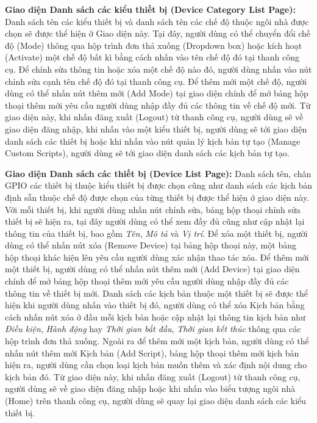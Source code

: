 \documentclass[12pt,a4paper,oneside]{extbook}
\begin{document}
\textbf{Giao diện Danh sách các kiểu thiết bị (Device Category List Page):} Danh sách tên các kiểu thiết bị và danh sách tên các chế độ thuộc ngôi nhà được chọn sẽ được thể hiện ở Giao diện này. Tại đây, người dùng có thể chuyển đổi chế độ (Mode) thông qua hộp trình đơn thả xuống (Dropdown box) hoặc kích hoạt (Activate) một chế độ bất kì bằng cách nhấn vào tên chế độ đó tại thanh công cụ. Để chỉnh sửa thông tin hoặc xóa một chế độ nào đó, người dùng nhấn vào nút chỉnh sửa cạnh tên chế độ đó tại thanh công cụ. Để thêm mới một chế độ, người dùng có thể nhấn nút thêm mới (Add Mode) tại giao diện chính để mở bảng hộp thoại thêm mới yêu cầu người dùng nhập đầy đủ các thông tin về chế độ mới. Từ giao diện này, khi nhấn đăng xuất (Logout) từ thanh công cụ, người dùng sẽ về giao diện đăng nhập, khi nhấn vào một kiểu thiết bị, người dùng sẽ tới giao diện danh sách các thiết bị hoặc khi nhấn vào nút quản lý kịch bản tự tạo (Manage Custom Scripts), người dùng sẽ tới giao diện danh sách các kịch bản tự tạo.

\textbf{Giao diện Danh sách các thiết bị (Device List Page):} Danh sách tên, chân GPIO các thiết bị thuộc kiểu thiết bị được chọn cũng như danh sách các kịch bản định sẵn thuộc chế độ được chọn của từng thiết bị được thể hiện ở giao diện này. Với mỗi thiết bị, khi người dùng nhấn nút chỉnh sửa, bảng hộp thoại chỉnh sửa thiết bị sẽ hiện ra, tại đây người dùng có thể xem đầy đủ cũng như cập nhật lại thông tin của thiết bị, bao gồm \textit{Tên}, \textit{Mô tả} và \textit{Vị trí}. Để xóa một thiết bị, người dùng có thể nhấn nút xóa (Remove Device) tại bảng hộp thoại này, một bảng hộp thoại khác hiện lên yêu cầu người dùng xác nhận thao tác xóa. Để thêm mới một thiết bị, người dùng có thể nhấn nút thêm mới (Add Device) tại giao diện chính để mở bảng hộp thoại thêm mới yêu cầu người dùng nhập đầy đủ các thông tin về thiết bị mới. Danh sách các kịch bản thuộc một thiết bị sẽ được thể hiện khi người dùng nhấn vào thiết bị đó, người dùng có thể xóa Kịch bản bằng cách nhấn nút xóa ở đầu mỗi kịch bản hoặc cập nhật lại thông tin kịch bản như \textit{Điều kiện}, \textit{Hành động} hay \textit{Thời gian bắt đầu}, \textit{Thời gian kết thúc} thông qua các hộp trình đơn thả xuống. Ngoài ra để thêm mới một kịch bản, người dùng có thể nhấn nút thêm mới Kịch bản (Add Script), bảng hộp thoại thêm mới kịch bản hiện ra, người dùng cần chọn loại kịch bản muốn thêm và xác định nội dung cho kịch bản đó. Từ giao diện này, khi nhấn đăng xuất (Logout) từ thanh công cụ, người dùng sẽ về giao diện đăng nhập hoặc khi nhấn vào biểu tượng ngôi nhà (Home) trên thanh công cụ, người dùng sẽ quay lại giao diện danh sách các kiểu thiết bị.
\end{document}
